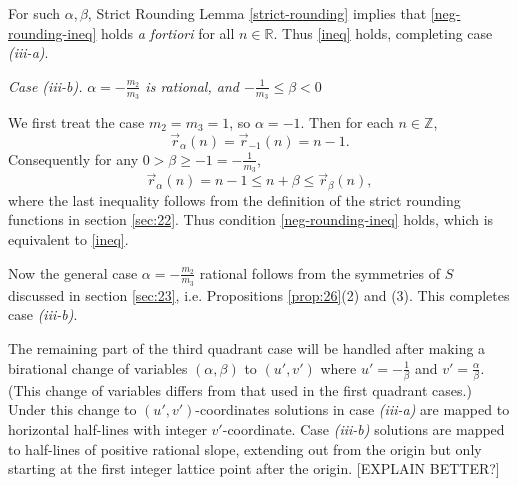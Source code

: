 \documentclass[12pt,letterpaper, reqno]{amsart}
\theoremstyle{definition}
\theoremstyle{remark}
\newcommand{\RR}{\ensuremath{\mathbb{R}}}
\newcommand{\ZZ}{\ensuremath{\mathbb{Z}}}
\newcommand{\uu}{{u'}}
\newcommand{\vv}{{v'}}
\newcommand{\floor}[1]{\lfloor{#1}\rfloor}
\newcommand{\tround}{\vec{r}}
\begin{document}
For such $\alpha,\beta$, Strict Rounding Lemma \ref{strict-rounding} implies that \eqref{neg-rounding-ineq} holds {\em a fortiori} for all $n\in\RR$.
Thus \eqref{ineq} holds, completing case {\it (iii-a)}.
\medskip



 {\em Case {\it (iii-b)}.} {\em ${\alpha} = -\frac{m_2}{m_3}$ is rational, and $-\frac1{m_3}\leq\beta <0$}
\medskip

We first treat the case ${m_2}=m_3=1$, so $\alpha=-1$.
Then for each $n \in\ZZ$,  
\[ \vec{r}_\alpha(n) = \tround_{-1}(n) = n -1.\]
Consequently for any $0>\beta \geq -1 = -\frac1{m_3}$,
\[ \tround_\alpha(n) = n -1 \leq n + \beta \leq  \vec{r}_\beta(n),\]
where the last inequality follows from the definition of the strict rounding functions in section \ref{sec:22}.
Thus condition \eqref{neg-rounding-ineq} holds, which is equivalent to \eqref{ineq}.

Now the general case $\alpha = -\frac{m_2}{m_3}$ rational follows from the symmetries of $S$ discussed in section \ref{sec:23}, i.e. Propositions \ref{prop:26}(2) and (3).
This completes case {\it (iii-b)}. 

\medskip


The  remaining part of the third quadrant case will be handled after making a 
birational change of variables
$(\alpha, \beta)$ to $(\uu, \vv)$ where 
$\uu= -\frac{1}{\beta}$ and $\vv= \frac{\alpha}{\beta}$.
(This change of variables differs from that used in the first quadrant cases.)
Under this change to $(\uu,\vv)$-coordinates  solutions  in case {\it (iii-a)} 
are mapped to horizontal half-lines with integer $\vv$-coordinate.
Case {\it (iii-b)} solutions are  mapped to half-lines of positive rational slope, extending out from the origin but only starting at the first integer lattice point after the origin. [EXPLAIN BETTER?]
\end{document}
